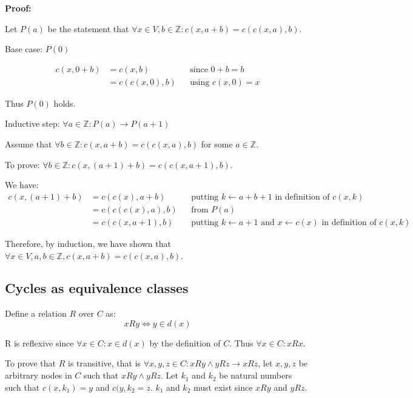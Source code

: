 \documentclass[11pt]{article}
\begin{document}
    \textbf{Proof:}

    Let $P(a)$ be the statement that $\forall x \in V, b \in \mathbb{Z}:c(x, a+b) = c(c(x,a),b)$.

    Base case: $P(0)$

    \begin{align*}
        \text{$c(x,0+b)$} &= \text{$c(x,b)$} && \text{since $0+b = b$} \\
        &= \text{$c(c(x,0),b)$} && \text{using $c(x,0) = x$}
    \end{align*}


    Thus $P(0)$ holds.

    Inductive step: $\forall a \in \mathbb{Z}: P(a) \rightarrow P(a+1)$

    Assume that $\forall b \in \mathbb{Z}:c(x, a+b) = c(c(x,a),b)$ for some $a \in \mathbb{Z}$.

    To prove:  $\forall b \in \mathbb{Z}: c(x, (a+1)+b) = c(c(x,a+1),b)$.

    We have:
    \begin{align*}
        \text{$c(x,(a+1)+b)$} &= \text{$c(c(x),a+b)$} && \text{putting $k \leftarrow a+b+1$ in definition of $c(x,k)$} \\
        &= \text{$c(c(c(x),a),b)$} && \text{from $P(a)$} \\
        &= \text{$c(c(x,a+1),b)$} && \text{putting $k \leftarrow a+1$ and $x \leftarrow c(x)$ in definition of $c(x,k)$}
    \end{align*}

    Therefore, by induction, we have shown that $\forall x \in V, a,b \in \mathbb{Z}, c(x, a+b) = c(c(x,a),b)$.





    \subsection{Cycles as equivalence classes}

    Define a relation $R$ over $C$ as:
    \begin{equation}
        xRy \Leftrightarrow y \in d(x)
    \end{equation}

    R is reflexive since $\forall x \in C: x\in d(x)$ by the definition of $C$. Thus $\forall x \in C: xRx$.

    To prove that $R$ is transitive, that is $\forall x,y,z \in C: xRy \land yRz \rightarrow xRz$, let $x,y,z$ be arbitrary nodes in $C$ such that $xRy \land yRz$. Let $k_{1}$ and $k_{2}$ be natural numbers such that $c(x,k_{1})=y$ and $c(y,k_{2}=z$. $k_{1}$ and $k_{2}$ must exist since $xRy$ and $yRz$.
\end{document}

